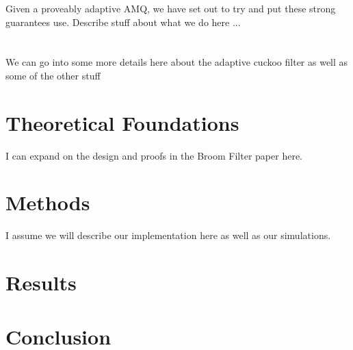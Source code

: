 \documentclass[11pt]{article}
\begin{document}
	Given a proveably adaptive AMQ, we have set out to try and put these strong guarantees use.  Describe stuff about what we do here ...

\section{}
We can go into some more details here about the adaptive cuckoo filter as well as some of the other stuff
\section{Theoretical Foundations}
I can expand on the design and proofs in the Broom Filter paper here.  
\section{Methods}
I assume we will describe our implementation here as well as our simulations. 
\section{Results}

\section{Conclusion}




\end{document}
